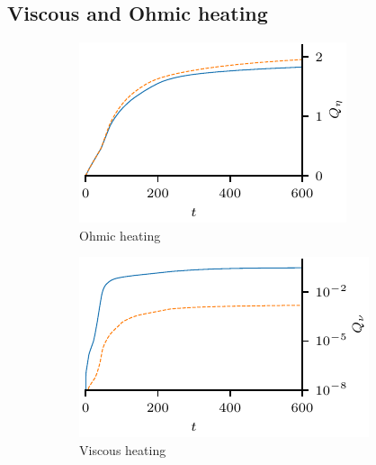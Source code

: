 \subsection{Viscous and Ohmic heating}

\begin{figure}[t]
    \centering
    \begin{subfigure}[t]{0.32\textwidth}
      \includegraphics[width=\textwidth]{ohmic_heating_over_time.pdf}
      \caption{Ohmic heating}
    \end{subfigure}
    \begin{subfigure}[t]{0.32\textwidth}
      \includegraphics[width=\textwidth]{viscous_heating_over_time.pdf}
      \caption{Viscous heating}
    \end{subfigure}
    \begin{subfigure}[t]{0.32\textwidth}

\end{subfigure}
\end{figure}
